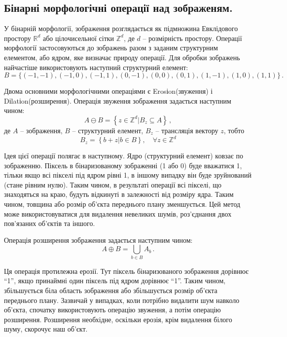 \subsection{Бінарні морфологічні операції над зображеням.}

У бінарній морфології, зображення розглядається як підмножина Евклідового простору \(\mathbb{R}^d\) або цілочисельної сітки \(\mathbb{Z}^d\), де \(d\) -- розмірність простору. Операції морфології застосовуються до зображень разом з заданим структурним елементом, або ядром, яке визначає природу операції. Для обробки зображень найчастіше використовують наступний структурний елемент:
\begin{equation*}
B = \{ (-1, -1), (-1, 0), (-1, 1), (0, -1), (0, 0), (0, 1), (1, -1), (1, 0), (1, 1)\}\,.
\end{equation*}

Двома основними морфологічними операціями є Erosіon(звуження) і Dіlatіon(розширення). Операція звуження зображення задається наступним чином:
\begin{equation*}
A \ominus B = \left\{ z \in \mathbb{Z}^d | B_z \subseteq A \right\}\,,
\end{equation*}
де \(A\) -- зображення, \(B\) -- структурний елемент, \(B_z\) -- трансляція вектору \(z\), тобто
\begin{equation*}
B_z = \left\{ b + z | b \in B \right\}, \quad \forall z \in \mathbb{Z}^d
\end{equation*}

Ідея цієї операції полягає в наступному. Ядро (структурний елемент) ковзає по зображенню. Піксель в бінаризованому зображенні (1 або 0) буде вважатися 1, тільки якщо всі пікселі під ядром рівні 1, в іншому випадку він буде зруйнований (стане рівним нулю). Таким чином, в результаті операції всі пікселі, що знаходяться на краю, будуть відкинуті в залежності від розміру ядра. Таким чином, товщина або розмір об'єкта переднього плану зменшується. Цей метод може використовуватися для видалення невеликих шумів, роз’єднання двох пов'язаних об'єктів та іншого.

Операція розширення зображення задається наступним чином:
\begin{equation*}
A  \oplus B = \bigcup_{b\in B} A_b\,.
\end{equation*}

Ця операція протилежна ерозії. Тут піксель бінаризованого зображення  дорівнює \enquote{1}, якщо принаймні один піксель під ядром дорівнює \enquote{1}. Таким чином, збільшується біла область зображення або збільшується розмір об'єкта переднього плану. Зазвичай у випадках, коли потрібно видалити шум навколо об’єкта, спочатку використовують операцію звуження, а потім операцію розширення. Розширення необхідне, оскільки ерозія, крім видалення білого шуму, скорочує наш об'єкт. 

